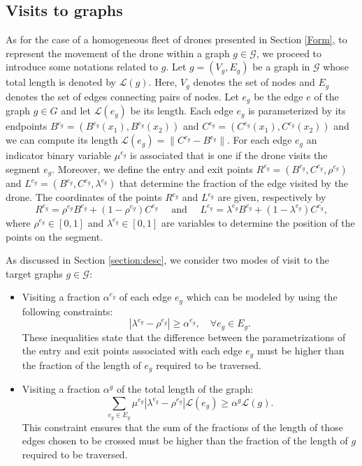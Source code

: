 \documentclass[10pt,a4paper]{elsarticle}
\newcommand{\EN}[1]{{\color{black}#1}}
\begin{document}
\subsection*{Visits \EN{to} graphs}
\noindent
As for the case of a homogeneous fleet of drones presented in Section \ref{Form}, to represent the movement of the drone within a graph $g\in\mathcal G$, we proceed to introduce some notation\EN{s} related to $g$.
Let $g = (V_g, E_g)$ be a graph in $\mathcal G$ whose total length is denoted by $\mathcal L(g)$. Here, $V_g$ denotes the set of nodes and $E_g$ denotes the set of edges connecting pairs of nodes.  Let $e_g$ be the edge $e$ of the graph $g \in G$ and let $\mathcal  L(e_g)$ be its length. Each edge $e_g$ is parameterized by its endpoints $B^{e_g}= (B^{e_g}(x_1), B^{e_g}(x_2))$ and $C^{e_g}= (C^{e_g}(x_1), C^{e_g}(x_2))$ and we can compute its length $\mathcal L(e_g) =\|C^{e_g} -  B^{e_g}\|$. 
\noindent
For each edge $e_g$ an indicator binary variable $\mu^{e_g}$ \EN{is associated} that is one if the drone visits the segment $e_g$. Moreover, we define the entry and exit points $R^{e_g}=(B^{e_g},C^{e_g},\rho^{e_g})$ and $L^{e_g}=(B^{e_g},C^{e_g},\lambda^{e_g})$ that determine the fraction of the edge visited by the drone. The coordinates of the points $R^{e_g}$ and $L^{e_g}$ are given, respectively by 
$$R^{e_g} = \rho^{e_g} B^{e_g} + (1- \rho^{e_g})C^{e_g} \quad\text{ and }\quad L^{e_g} = \lambda^{e_g} B^{e_g} + (1- \lambda^{e_g})C^{e_g},$$ where $\rho^{e_g} \in [0,1]$ and $\lambda^{e_g} \in [0,1]$ are variables to determine the position of the points on the segment.

\noindent
As discussed in Section \ref{section:desc}, we consider two modes of visit to the target graphs $g\in \mathcal{G}$:
\begin{itemize}
	\item Visiting a fraction $\alpha^{e_g}$ of each edge $e_g$ which can be modeled by using the following constraints:
	\begin{equation}\label{eq:NOalphaE}\tag{$\alpha$-E}
		|\lambda^{e_g} - \rho^{e_g}|\geq \alpha^{e_g}, \quad \forall e_g\in E_g.
	\end{equation}
	These inequalities state that the difference between the parametrizations of the entry and exit points associated \EN{with} each edge $e_g$ must be higher than the fraction of the length of $e_g$ required to be traversed.
	\item Visiting a fraction $\alpha^g$ of the total length of the graph:
	\begin{equation}\label{eq:NOalphaG}\tag{$\alpha$-G}
		\sum_{e_g\in E_g} \mu^{e_g}|\lambda^{e_g} - \rho^{e_g}|\mathcal L(e_g) \geq \alpha^g\mathcal L(g).
	\end{equation}
	\noindent
	This constraint ensures that the sum of the fractions of the length of those edges chosen to be crossed must be higher than the fraction of the length of $g$ required to be traversed.
\end{itemize}
\end{document}
